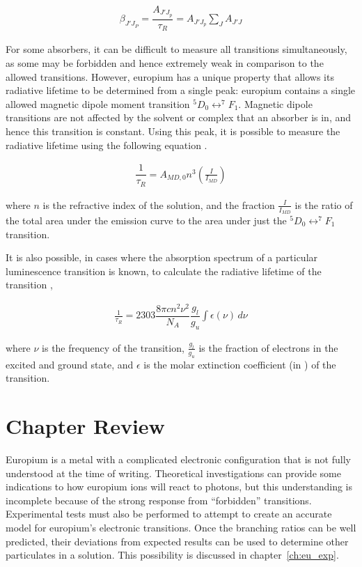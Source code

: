 \begin{align}
  \beta_{J'J_P} = \dfrac{A_{J'J_p}}{\tau_R} = A_{J'J_p}\sum_J A_{J'J} \label{eq:branch_ratio}
\end{align}

For some absorbers, it can be difficult to measure all transitions
simultaneously, as some may be forbidden and hence extremely weak in comparison
to the allowed transitions. However, europium has a unique property that allows
its radiative lifetime to be determined from a single peak: europium contains a
single allowed magnetic dipole moment transition $^5D_0 \leftrightarrow ^7F_1$.
Magnetic dipole transitions are not affected by the solvent or complex that an
absorber is in, and hence this transition is constant.
Using this peak, it is possible to measure the radiative lifetime using the
following equation \cite{Werts:2002fs}.

\begin{align}
  \dfrac{1}{\tau_R} = A_{MD,0}n^3\left(\frac{I}{I_{MD}}\right) \label{eq:nat_life_eu}
\end{align}

where $n$ is the refractive index of the solution, and the fraction
$\frac{I}{I_{MD}}$ is the ratio of the total area under the emission curve to
the area under just the $^5D_0 \leftrightarrow ^7F_1$ transition.

It is also possible, in cases where the absorption spectrum of a particular
luminescence transition is known, to calculate the radiative lifetime of the
transition \cite{Lewis:1945tp},

\begin{align}
  \frac{1}{\tau_R} = 2303 \dfrac{8\pi c n ^2 \nu^2}{N_A}\dfrac{g_l}{g_u}\int\epsilon(\nu)\,d\nu \label{eq:nat_life_abs}
\end{align}

where $\nu$ is the frequency of the transition, $\tfrac{g_l}{g_u}$ is the
fraction of electrons in the excited and ground state, and $\epsilon$ is the
molar extinction coefficient (in \iM\icm) of the transition.

\section*{Chapter Review}

Europium is a metal with a complicated electronic configuration that is not
fully understood at the time of writing. Theoretical investigations can
provide some indications to how europium ions will react to photons, but this
understanding is incomplete because of the strong response from ``forbidden''
transitions. Experimental tests must also be performed to attempt to create
an accurate model for europium's electronic transitions. Once the branching
ratios can be well predicted, their deviations from expected results can
be used to determine other particulates in a solution. This possibility is
discussed in chapter~\ref{ch:eu_exp}.
